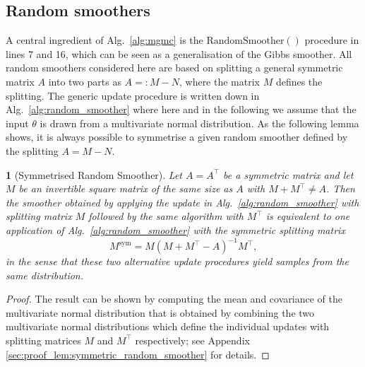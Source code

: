 \documentclass[11pt,english]{article}
\theoremstyle{plain}
\theoremstyle{plain}
\theoremstyle{plain}
\newtheorem{lem}[thm]{\protect\lemmaname}
\theoremstyle{plain}
\numberwithin{equation}{section}
\providecommand{\lemmaname}{Lemma}
\begin{document}
\subsection{Random smoothers}\label{sec:random_smoothers}
A central ingredient of Alg.~\ref{alg:mgmc} is the $\mathrm{RandomSmoother}()$ procedure in lines 7 and 16, which can be seen as a generalisation of the Gibbs smoother.
All random smoothers considered here are based on splitting a general symmetric matrix $A$ into two parts as $A =: M-N$, where the matrix $M$ defines the splitting. The generic update procedure is written down in Alg.~\ref{alg:random_smoother} where here and in the following we assume that the input $\theta$ is drawn from a multivariate normal distribution. As the following lemma shows, it is always possible to symmetrise a given random smoother defined by the splitting $A=M-N$.
\begin{algorithm}[t!]
    \caption{Random Smoother for updating $\theta\mapsto \theta'$ based on the matrix splitting $A=M-N$}\label{alg:random_smoother}
    \begin{algorithmic}[1]
        \State{}
        \EndProcedure
    \end{algorithmic}
\end{algorithm}
\begin{lem}[Symmetrised Random Smoother]\label{lem:symmetric_random_smoother}
    Let $A=A^\top$ be a symmetric matrix and let $M$ be an invertible square matrix of the same size as $A$ with $M+M^\top\ne A$.
    Then the smoother obtained by applying the update in Alg.~\ref{alg:random_smoother} with splitting matrix $M$ followed by the same algorithm with $M^\top$ is equivalent to one application of Alg.~\ref{alg:random_smoother} with the symmetric splitting matrix
    \begin{equation}
        M^{\mathrm{sym}} = M(M+M^\top-A)^{-1}M^\top,\label{eqn:symmetric_M}
    \end{equation}
    in the sense that these two alternative update procedures yield samples from the same distribution.
\end{lem}
\begin{proof}
    The result can be shown by computing the mean and covariance of the multivariate normal distribution that is obtained by combining the two multivariate normal distributions which define the individual updates with splitting matrices $M$ and $M^\top$ respectively; see Appendix \ref{sec:proof_lem:symmetric_random_smoother} for details.
\end{proof}
\end{document}

